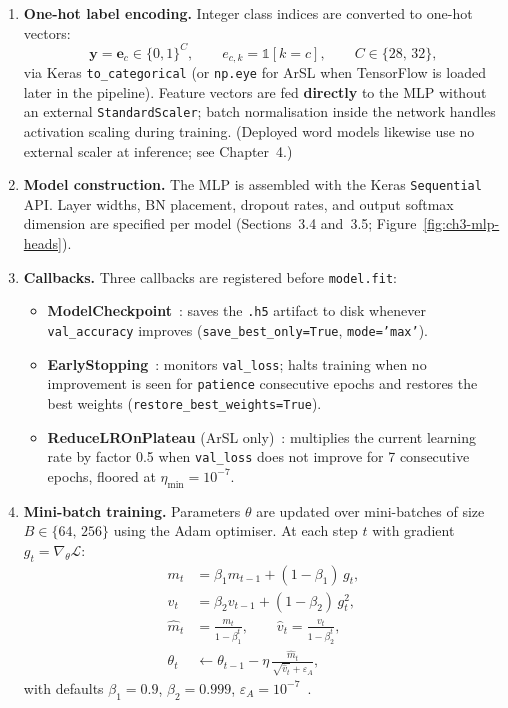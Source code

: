 \begin{enumerate}
\item \textbf{One-hot label encoding.} Integer class indices are converted to one-hot vectors:
\begin{equation}
\label{eq:ch3-onehot}
\mathbf{y} = \mathbf{e}_c \in \{0,1\}^C, \qquad e_{c,k} = \mathbb{1}[k = c], \qquad C \in \{28,\,32\},
\end{equation}
via Keras \texttt{to\_categorical} (or \texttt{np.eye} for ArSL when TensorFlow is loaded later in the pipeline). Feature vectors are fed \textbf{directly} to the MLP without an external \texttt{StandardScaler}; batch normalisation inside the network handles activation scaling during training. (Deployed word models likewise use no external scaler at inference; see Chapter~4.)

\item \textbf{Model construction.} The MLP is assembled with the Keras \texttt{Sequential} API. Layer widths, BN placement, dropout rates, and output softmax dimension are specified per model (Sections~3.4 and~3.5; Figure~\ref{fig:ch3-mlp-heads}).

\item \textbf{Callbacks.} Three callbacks are registered before \texttt{model.fit}:
\begin{itemize}
  \item \textbf{ModelCheckpoint}~\cite{chollet2015keras}: saves the \texttt{.h5} artifact to disk whenever \texttt{val\_accuracy} improves (\texttt{save\_best\_only=True}, \texttt{mode='max'}).
  \item \textbf{EarlyStopping}~\cite{chollet2015keras}: monitors \texttt{val\_loss}; halts training when no improvement is seen for \texttt{patience} consecutive epochs and restores the best weights (\texttt{restore\_best\_weights=True}).
  \item \textbf{ReduceLROnPlateau} (ArSL only)~\cite{chollet2015keras}: multiplies the current learning rate by factor 0.5 when \texttt{val\_loss} does not improve for 7 consecutive epochs, floored at $\eta_{\min} = 10^{-7}$.
\end{itemize}

\item \textbf{Mini-batch training.} Parameters $\theta$ are updated over mini-batches of size $B \in \{64,\,256\}$ using the Adam optimiser. At each step $t$ with gradient $g_t = \nabla_\theta \mathcal{L}$:
\begin{align}
m_t &= \beta_1 m_{t-1} + (1-\beta_1)\, g_t, \label{eq:adam-m}\\
v_t &= \beta_2 v_{t-1} + (1-\beta_2)\, g_t^2, \label{eq:adam-v}\\
\hat{m}_t &= \frac{m_t}{1-\beta_1^t}, \qquad \hat{v}_t = \frac{v_t}{1-\beta_2^t}, \label{eq:adam-bias}\\
\theta_t &\leftarrow \theta_{t-1} - \eta\,\frac{\hat{m}_t}{\sqrt{\hat{v}_t}+\varepsilon_A}, \label{eq:adam-update}
\end{align}
with defaults $\beta_1{=}0.9$, $\beta_2{=}0.999$, $\varepsilon_A{=}10^{-7}$~\cite{kingma2015adam}.


\end{enumerate}
